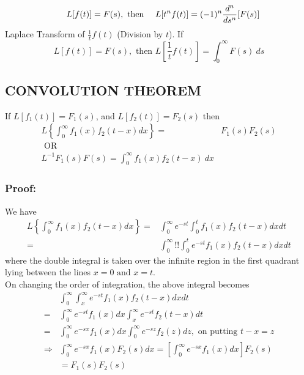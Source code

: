 \documentclass[12pt]{report}
\begin{document}
\begin{equation*}
\quad L[f(t)]=F(s), \mbox{ then } \\
\quad L[t^nf(t)]=(-1)^n \frac{d^n}{ds^n}[F(s)]
\end{equation*}
Laplace Transform of $\frac{1}{t}f(t)$ (Division by $t$). If
\begin{equation*}
L[f(t)]=F(s), \mbox{ then } L \left[\frac{1}{t}f(t)\right]=\int_0^\infty F(s)~ds
\end{equation*}
\subsection{CONVOLUTION THEOREM}
If $L[f_1(t)]=F_1(s)$, and $L[f_2(t)]=F_2(s)$ then
\begin{align*}
L \left\{\int_0^\infty f_1(x)f_2(t-x)dx\right\}=&F_1(s) F_2(s) \\
\mbox{ OR } \\
L^{-1}F_1(s)F(s)=\int_0^\infty f_1(x)f_2(t-x)~dx
\end{align*}
\subsubsection{Proof:}
We have
\begin{align*}
L \left \{\int_0^\infty f_1(x)f_2(t-x)dx \right\} = &\int_0^\infty e^{-st} \int_0^t f_1(x)f_2(t-x)dx dt \\
= & \int_0^\infty !! \int_0^t e^{-st}f_1(x)f_2(t-x)dx dt
\end{align*}
where the double integral is taken over the infinite region in the first quadrant lying between the lines $x=0 \mbox{ and } x=t$.\\
On changing the order of integration, the above integral becomes 
\begin{align*}
&\int_0^\infty \int_x^\infty e^{-st}f_1(x)f_2(t-x)dxdt \\
= &\int_0^\infty e^{-st}f_1(x)dx \int_x^\infty e^{-st}f_2(t-x)dt \\
= & \int_0^\infty e^{-sx}f_1(x)dx \int_0^\infty e^{-sz}f_2(z)dz, \mbox{ on putting } t-x=z \\
\Rightarrow &\int_0^\infty e^{-sx}f_1(x)F_2(s)dx = \left[\int_0^\infty e^{-sx}f_1(x)dx \right]F_2(s) \\
& = F_1(s) F_2(s)
\end{align*}
\end{document}
